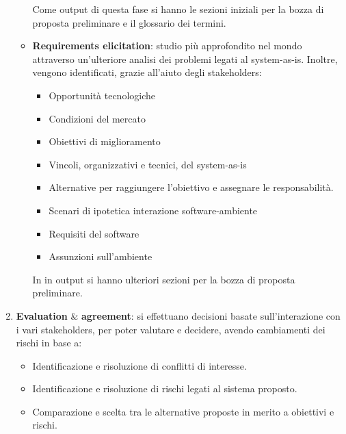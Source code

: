 \begin{enumerate}
\begin{itemize}
                        Come output di questa fase si hanno le sezioni iniziali
                        per la bozza di proposta preliminare e il glossario dei
                        termini.
                  \item \textbf{Requirements elicitation}: studio più approfondito
                        nel mondo attraverso un'ulteriore analisi dei problemi
                        legati al system-as-is. Inoltre, vengono identificati,
                        grazie all'aiuto degli stakeholders:
                        \begin{itemize}
                              \item Opportunità tecnologiche
                              \item Condizioni del mercato
                              \item Obiettivi di miglioramento
                              \item Vincoli, organizzativi e tecnici, del system-as-is
                              \item Alternative per raggiungere l'obiettivo e
                                    assegnare le responsabilità.
                              \item Scenari di ipotetica interazione software-ambiente
                              \item Requisiti del software
                              \item Assunzioni sull'ambiente
                        \end{itemize}
                        In in output si hanno ulteriori sezioni per la bozza di
                        proposta preliminare.
            \end{itemize}
      \item \textbf{Evaluation} $\&$ \textbf{agreement}: si effettuano decisioni
            basate sull'interazione con i vari stakeholders, per poter valutare
            e decidere, avendo cambiamenti dei rischi in base a:
            \begin{itemize}
                  \item Identificazione e risoluzione di conflitti di interesse.
                  \item Identificazione e risoluzione di rischi legati al sistema
                        proposto.
                  \item Comparazione e scelta tra le alternative proposte in
                        merito a obiettivi e rischi.

\end{itemize}
\end{enumerate}

